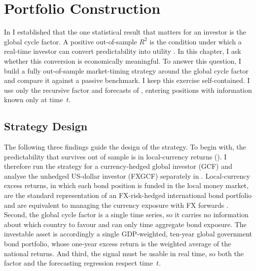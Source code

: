 \chapter{Portfolio Construction}
\label{ch:strategy}

In  I established that the one statistical result that matters
for an investor is the global cycle factor. A positive out-of-sample $R^{2}$ is
the condition under which a real-time investor can convert
predictability into utility \citep{campbellthompson2008}. In this chapter, I
ask whether this conversion is economically meaningful. To answer this
question, I build a fully out-of-sample market-timing strategy around the
global cycle factor and compare it against a passive benchmark. I keep this
exercise self-contained. I use only the recursive factor and
forecasts of , entering positions with information known
only at time~$t$.

\section{Strategy Design}
\label{sec:strat-design}

The following three findings guide the design of the strategy. To begin with, the
predictability that survives out of sample is in local-currency
returns (). I
therefore run the strategy for a currency-hedged global investor (GCF)
and analyse the unhedged US-dollar investor (FXGCF) separately in
.
Local-currency excess returns, in which each bond position is funded in the
local money market, are the standard representation of an FX-risk-hedged
international bond portfolio and are equivalent to managing the currency
exposure with FX forwards \citep{randl2025}. Second, the global cycle factor
is a single time series, so it carries no information about which country to
favour and can only time aggregate bond exposure. The investable asset
is accordingly a single GDP-weighted, ten-year global government bond
portfolio, whose one-year excess return is the weighted average of the
national returns. And third, the signal must be usable in real
time, so both the factor and the forecasting regression respect time~$t$.


